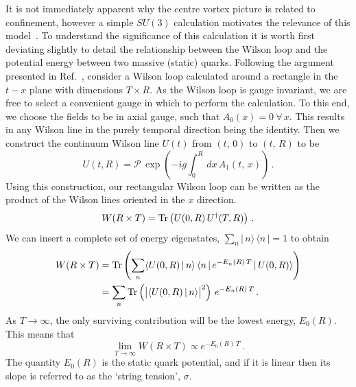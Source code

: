 It is not immediately apparent why the centre vortex picture is related to confinement, however a simple $SU(3)$ calculation motivates the relevance of this model~\cite{Greensite:2016pfc}. To understand the significance of this calculation it is worth first deviating slightly to detail the relationship between the Wilson loop and the potential energy between two massive (static) quarks. Following the argument presented in Ref.~\cite{Makeenko:2009dw}, consider a Wilson loop calculated around a rectangle in the $t-x$ plane with dimensions $T\times R$. As the Wilson loop is gauge invariant, we are free to select a convenient gauge in which to perform the calculation. To this end, we choose the fields to be in axial gauge, such that $A_0(x)=0~\forall\, x$. This results in any Wilson line in the purely temporal direction being the identity. Then we construct the continuum Wilson line $U(t)$ from $(t,\,0)$ to $(t,\,R)$ to be
%
\begin{equation}
U(t,R) = \mathcal{P}\,\exp\left(-ig\int_0^R\,dx\, A_1(t,\,x)\right)\, .
\end{equation}
%
%
Using this construction, our rectangular Wilson loop can be written as the product of the Wilson lines oriented in the $x$ direction.
\begin{equation}
W(R\times T) = \operatorname{Tr} \left(U(0,R) \,U^\dagger(T,R)\right)\, .
\end{equation}
%
We can insert a complete set of energy eigenstates, $\sum_n |\,n\rangle\,\langle n \,|=1$ to obtain
%
\begin{align}
W(R\times T) &= \operatorname{Tr} \left( \sum_n \langle U(0,R)\, |\, n\rangle\,\langle n\, |\, e^{-E_n(R)\, T}\, | \, U(0,R) \rangle\right)\nonumber\\
&=  \sum_n \operatorname{Tr} \left( \big|\langle U(0,R)\, |\, n\rangle\big|^2 \right)\,e^{-E_n(R)\,T} \, .
\end{align}
%
As $T\rightarrow \infty$, the only surviving contribution will be the lowest energy, $E_0(R)$. This means that
%
\begin{equation}
\lim_{T\rightarrow \infty} W(R\times T) \propto e^{-E_0(R)\, T}\, .
\label{eq:WilsonEnergy}
\end{equation}
The quantity $E_0(R)$ is the static quark potential, and if it is linear then its slope is referred to as the `string tension', $\sigma$.
\\

